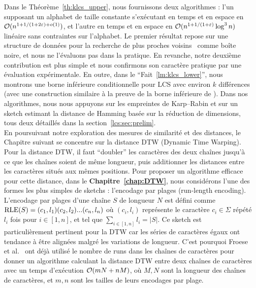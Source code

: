 Dans le Théorème~\ref{th:klcs_upper}, nous fournissons deux algorithmes : l'un supposant un alphabet de taille constante s'exécutant en temps et en espace en $\mathcal{O}(n^{1+ 1/(1+2\varepsilon) + o(1)})$, et l'autre en temps et en espace en $\mathcal{O}(n^{1+1/(1+\varepsilon)} \log^3 n)$  linéaire sans contraintes sur l'alphabet. Le premier résultat repose sur une structure de données pour la recherche de plus proches voisins~\cite{DBLP:conf/stoc/AndoniR15} comme boîte noire, et nous ne l'évaluons pas dans la pratique. En revanche, notre deuxième contribution est plus simple et nous confirmons son caractère pratique par une évaluation expérimentale.
En outre, dans le ``Fait~\ref{lm:klcs_lower}'', nous montrons une borne inférieure conditionnelle pour LCS avec environ $k$ différences (avec une construction similaire à la preuve de la borne inférieure de \kLCS ).
Dans nos algorithmes, nous nous appuyons sur les empreintes de Karp--Rabin et sur un sketch estimant la distance de Hamming basée sur la réduction de dimensions, tous deux détaillés dans la section~\ref{lcs:sec:prelim}. \\


En poursuivant notre exploration des mesures de similarité et des distances, le Chapitre suivant se concentre sur la distance DTW (Dynamic Time Warping). Pour la distance DTW, il faut ``doubler'' les caractères des deux chaînes jusqu'à ce que les chaînes soient de même longueur, puis additionner les distances entre les caractères situés aux mêmes positions.
Pour proposer un algorithme efficace pour cette distance, dans le \textbf{Chapitre~\ref{chap:DTW}}, nous considérons l'une des formes les plus simples de sketchs : l'encodage par plages (run-length encoding). L'encodage par plages d'une chaîne $S$ de longueur $N$ est défini comme $\mathrm{RLE}(S)=(c_1,l_1)(c_2,l_2)... (c_n,l_n)$ où $(c_i,l_i)$ représente le caractère $c_i \in \Sigma$ répété $l_i$ fois pour $i \in [1,n]$, et tel que $\sum_{i\in [1,n]} l_i = |S|$.
Ce sketch est particulièrement pertinent pour la DTW car les séries de caractères égaux ont tendance à être alignées malgré les variations de longueur. C'est pourquoi Froese et al.~\cite{DBLP:journals/corr/abs-1903-03003} ont déjà utilisé le nombre de runs dans les chaînes de caractères pour donner un algorithme calculant la distance DTW entre deux chaînes de caractères avec un temps d'exécution $\mathcal{O}(mN+nM)$, où $M,N$ sont la longueur des chaînes de caractères, et $m, n$ sont les tailles de leurs encodages par plage.

